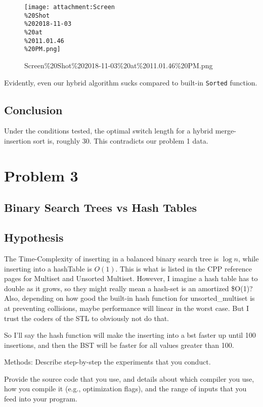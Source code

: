 \documentclass[11pt]{article}
\makeatletter
\def\maxwidth{\ifdim\Gin@nat@width>\linewidth\linewidth
    \else\Gin@nat@width\fi}
\let\Oldincludegraphics\includegraphics
\renewcommand{\includegraphics}[1]{\Oldincludegraphics[width=.8\maxwidth]{#1}}
\makeatother
\begin{document}
    \begin{figure}
\centering
\texttt{[image: attachment:Screen\\\%20Shot\\\%202018-11-03\\\%20at\\\%2011.01.46\\\%20PM.png]}
\caption{Screen\%20Shot\%202018-11-03\%20at\%2011.01.46\%20PM.png}
\end{figure}

Evidently, even our hybrid algorithm sucks compared to built-in
\texttt{Sorted} function.

    \subsection{Conclusion}\label{conclusion}

Under the conditions tested, the optimal switch length for a hybrid
merge-insertion sort is, roughly 30. This contradicts our problem 1
data.

    \section{Problem 3}\label{problem-3}

\subsection{Binary Search Trees vs Hash
Tables}\label{binary-search-trees-vs-hash-tables}

    \subsection{Hypothesis}\label{hypothesis}

The Time-Complexity of inserting in a balanced binary search tree is
\(\log{n}\), while inserting into a hashTable is \(O(1)\). This is what
is listed in the CPP reference pages for Multiset and Unsorted Multiset.
However, I imagine a hash table has to double as it grows, so they might
really mean a hash-set is an amortized \$O(1)? Also, depending on how
good the built-in hash function for unsorted\_multiset is at preventing
collisions, maybe performance will linear in the worst case. But I trust
the coders of the STL to obviously not do that.

So I'll say the hash function will make the inserting into a bst faster
up until 100 insertions, and then the BST will be faster for all values
greater than 100.

    Methods: Describe step-by-step the experiments that you conduct.

Provide the source code that you use, and details about which compiler
you use, how you compile it (e.g., optimization flags), and the range of
inputs that you feed into your program.
\end{document}
